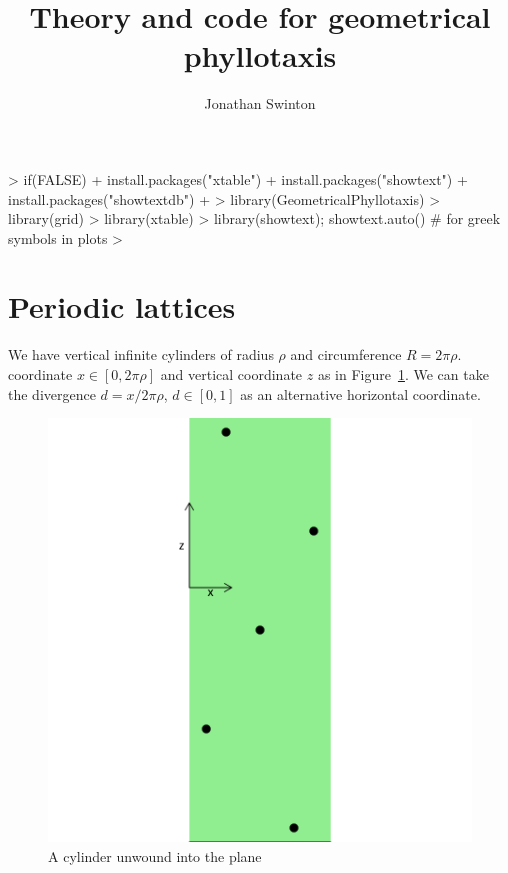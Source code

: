 \documentclass[a4paper]{article}
\begin{document}


\title{Theory and code for geometrical phyllotaxis}
\author{Jonathan Swinton}
\maketitle

\begin{Schunk}
\begin{Sinput}
> if(FALSE) {
+   install.packages("xtable")
+   install.packages("showtext")
+   install.packages("showtextdb")
+ }
> library(GeometricalPhyllotaxis)
> library(grid)
> library(xtable)
> library(showtext); showtext.auto() # for greek symbols in plots
> 
\end{Sinput}
\end{Schunk}


\section{Periodic lattices}
We have vertical infinite cylinders of radius $\rho$ and circumference $R=2\pi\rho$.
coordinate $x \in [0,2\pi\rho]$  and vertical coordinate $z$ as in Figure~\ref{fig:cylcoord}.
We can take the divergence $d=x/2\pi\rho$, $d\in [0,1]$ as an alternative horizontal coordinate.

\begin{center}
\begin{figure}[H]
\includegraphics{figdir/fig-plotPGtest}
\caption{A cylinder unwound into the plane}
\label{fig:cylcoord}
\end{figure}
\end{center}
\end{document}
